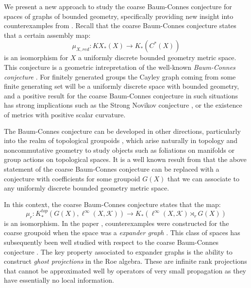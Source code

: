 We present a new approach to study the coarse Baum-Connes conjecture for spaces of graphs of bounded geometry, specifically providing new insight into counterexamples from \cite{higsonpreprint,MR1911663,explg1}. Recall that the coarse Baum-Connes conjecture states that a certain assembly map:
\begin{equation*}
\mu_{X,red}:KX_{*}(X) \longrightarrow K_{*}(C^{*}(X))
\end{equation*}
is an isomorphism for $X$ a uniformly discrete bounded geometry metric space. This conjecture is a geometric intrepretation of the well-known \textit{Baum-Connes conjecture} \cite{MR1292018}. For finitely generated groups the Cayley graph coming from some finite generating set will be a uniformly discrete space with bounded geometry, and a positive result for the coarse Baum-Connes conjecture in such situations has strong implications such as the Strong Novikov conjecture \cite{MR866507}, or the existence of metrics with positive scalar curvature.

The Baum-Connes conjecture can be developed in other directions, particularly into the realm of topological groupoids \cite{MR1798599}, which arise naturally in topology and noncommutative geometry to study objects such as foliations on manifolds or group actions on topological spaces. It is a well known result from \cite{MR1905840} that the above statement of the coarse Baum-Connes conjecture can be replaced with a conjecture with coefficients for some groupoid $G(X)$ that we can associate to any uniformly discrete bounded geometry metric space.

In this context, the coarse Baum-Connes conjecture states that the map:
\begin{equation*}
\mu_{r}:K_{*}^{top}(G(X), \ell^{\infty}(X,\mathcal{K})) \rightarrow K_{*}(\ell^{\infty}(X,\mathcal{K})\rtimes_{r}G(X))
\end{equation*}
is an isomorphism. In the paper \cite{MR1911663}, counterexamples were constructed for the coarse groupoid when the space was a \textit{expander graph} \cite{MR2569682}. This class of spaces has subsequently been well studied with respect to the coarse Baum-Connes conjecture \cite{higsonpreprint,MR2431253,MR2419930,MR2764895,MR2568691,explg1,explg2}. The key property associated to expander graphs is the ability to construct \textit{ghost projections} in the Roe algebra. These are infinite rank projections that cannot be approximated well by operators of very small propagation as they have essentially no local information. 

